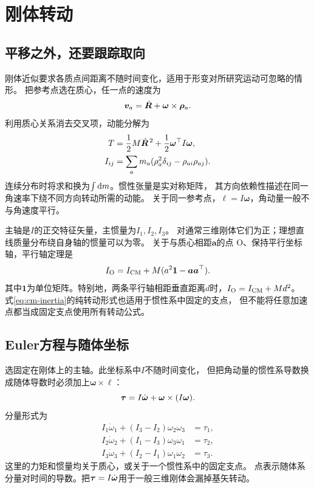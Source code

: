 \chapter{刚体转动}

\section{平移之外，还要跟踪取向}
刚体近似要求各质点间距离不随时间变化，适用于形变对所研究运动可忽略的情形。
把参考点选在质心，任一点的速度为
\begin{equation}
 \bm v_a = \dot{\bm{R}} + \bm\omega \times \bm\rho_a.
\end{equation}
利用质心关系消去交叉项，动能分解为
\begin{subequations}
 \begin{align}
  T &= \frac12M\dot{\bm{R}}^{\,2} + \frac12\bm\omega^\top I\bm\omega, \label{eq:cm-inertia}\\
  I_{ij} &= \sum_a m_a(\rho_a^2\delta_{ij} - \rho_{ai}\rho_{aj}).
 \end{align}
\end{subequations}
连续分布时将求和换为$\textstyle \int\mathop{}\!\mathrm{d} m$。惯性张量是实对称矩阵，
其方向依赖性描述在同一角速率下绕不同方向转动所需的动能。
关于同一参考点，$\bm\ell = I\bm\omega$，角动量一般不与角速度平行。

主轴是$I$的正交特征矢量，主惯量为$I_1,I_2,I_3$。
对通常三维刚体它们为正；理想直线质量分布绕自身轴的惯量可以为零。
关于与质心相距$\bm a$的点 $\mathrm O$、保持平行坐标轴，平行轴定理是
\begin{equation}
 I_{\mathrm O} = I_{\mathrm{CM}} + M(a^2\mathbf 1 - \bm a\bm a^\top).
\end{equation}
其中$\mathbf 1$为单位矩阵。特别地，两条平行轴相距垂直距离$d$时，$I_{\mathrm O} = I_{\mathrm{CM}} + Md^2$。
式\eqref{eq:cm-inertia}的纯转动形式也适用于惯性系中固定的支点，
但不能将任意加速点都当成固定支点使用所有转动公式。

\section{Euler方程与随体坐标}
选固定在刚体上的主轴。此坐标系中$I$不随时间变化，
但把角动量的惯性系导数换成随体导数时必须加上$\bm\omega \times \bm\ell$：
\begin{equation}
 \bm\tau = I\dot{\bm{\omega}} + \bm\omega \times (I\bm\omega).
\end{equation}
分量形式为
\begin{align}
 I_1\dot\omega_1 + (I_3 - I_2)\omega_2\omega_3 &= \tau_1,\\
 I_2\dot\omega_2 + (I_1 - I_3)\omega_3\omega_1 &= \tau_2,\\
 I_3\dot\omega_3 + (I_2 - I_1)\omega_1\omega_2 &= \tau_3.
 \label{eq:cm-euler-rigid}
\end{align}
这里的力矩和惯量均关于质心，或关于一个惯性系中的固定支点。
点表示随体系分量对时间的导数。把$\bm\tau = I\dot{\bm{\omega}}$用于一般三维刚体会漏掉基矢转动。

